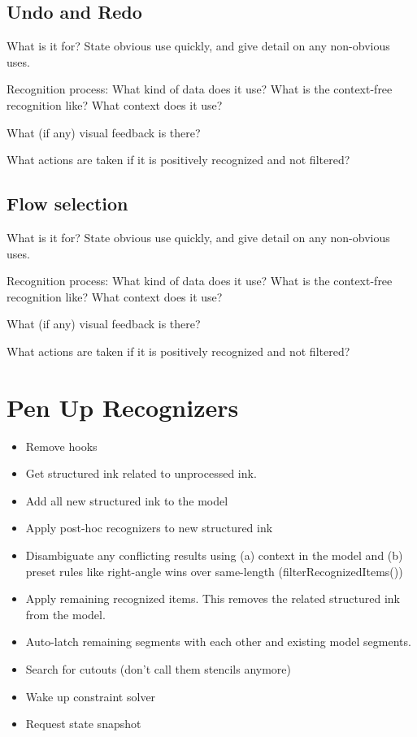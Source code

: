 \begin{samepage}
\begin{samepage}
\subsection{Undo and Redo}

What is it for? State obvious use quickly, and give detail on any
non-obvious uses.

Recognition process: What kind of data does it use? What is the
context-free recognition like? What context does it use?

What (if any) visual feedback is there?

What actions are taken if it is positively recognized and not
filtered?

\subsection{Flow selection}

What is it for? State obvious use quickly, and give detail on any
non-obvious uses.

Recognition process: What kind of data does it use? What is the
context-free recognition like? What context does it use?

What (if any) visual feedback is there?

What actions are taken if it is positively recognized and not
filtered?

\section{Pen Up Recognizers}

\begin{itemize}
\item Remove hooks
\item Get structured ink related to unprocessed ink.
\item Add all new structured ink to the model
\item Apply post-hoc recognizers to new structured ink
\item Disambiguate any conflicting results using (a) context in the
  model and (b) preset rules like right-angle wins over same-length
  (filterRecognizedItems())
\item Apply remaining recognized items. This removes the related
  structured ink from the model.
\item Auto-latch remaining segments with each other and existing model
  segments.
\item Search for cutouts (don't call them stencils anymore)
\item Wake up constraint solver
\item Request state snapshot
\end{itemize}


\end{samepage}
\end{samepage}
